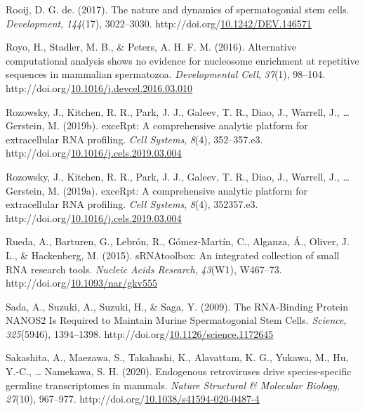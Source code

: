 \documentclass[12pt,twoside]{reedthesis}
\newlength{\cslhangindent}
\newenvironment{CSLReferences}[2] %
 {%
  \setlength{\parindent}{0pt}
  \ifodd #1 \everypar{\setlength{\hangindent}{\cslhangindent}}\ignorespaces\fi
  \ifnum #2 > 0
  \setlength{\parskip}{#2\baselineskip}
  \fi
 }%
 {}
\begin{document}
\begin{CSLReferences}{1}{0}
\leavevmode{}%
Rooij, D. G. de. (2017). The nature and dynamics of spermatogonial stem cells. \emph{Development}, \emph{144}(17), 3022--3030. http://doi.org/\href{https://doi.org/10.1242/DEV.146571}{10.1242/DEV.146571}

\leavevmode{}%
Royo, H., Stadler, M. B., \& Peters, A. H. F. M. (2016). Alternative computational analysis shows no evidence for nucleosome enrichment at repetitive sequences in mammalian spermatozoa. \emph{Developmental Cell}, \emph{37}(1), 98--104. http://doi.org/\href{https://doi.org/10.1016/j.devcel.2016.03.010}{10.1016/j.devcel.2016.03.010}

\leavevmode{}%
Rozowsky, J., Kitchen, R. R., Park, J. J., Galeev, T. R., Diao, J., Warrell, J., \ldots{} Gerstein, M. (2019b). {exceRpt}: A comprehensive analytic platform for extracellular {RNA} profiling. \emph{Cell Systems}, \emph{8}(4), 352--357.e3. http://doi.org/\href{https://doi.org/10.1016/j.cels.2019.03.004}{10.1016/j.cels.2019.03.004}

\leavevmode{}%
Rozowsky, J., Kitchen, R. R., Park, J. J., Galeev, T. R., Diao, J., Warrell, J., \ldots{} Gerstein, M. (2019a). exceRpt: A comprehensive analytic platform for extracellular RNA profiling. \emph{Cell Systems}, \emph{8}(4), 352357.e3. http://doi.org/\href{https://doi.org/10.1016/j.cels.2019.03.004}{10.1016/j.cels.2019.03.004}

\leavevmode{}%
Rueda, A., Barturen, G., Lebrón, R., Gómez-Martín, C., Alganza, Á., Oliver, J. L., \& Hackenberg, M. (2015). sRNAtoolbox: An integrated collection of small RNA research tools. \emph{Nucleic Acids Research}, \emph{43}(W1), W467--73. http://doi.org/\href{https://doi.org/10.1093/nar/gkv555}{10.1093/nar/gkv555}

\leavevmode{}%
Sada, A., Suzuki, A., Suzuki, H., \& Saga, Y. (2009). The RNA-Binding Protein NANOS2 Is Required to Maintain Murine Spermatogonial Stem Cells. \emph{Science}, \emph{325}(5946), 1394--1398. http://doi.org/\href{https://doi.org/10.1126/science.1172645}{10.1126/science.1172645}

\leavevmode{}%
Sakashita, A., Maezawa, S., Takahashi, K., Alavattam, K. G., Yukawa, M., Hu, Y.-C., \ldots{} Namekawa, S. H. (2020). Endogenous retroviruses drive species-specific germline transcriptomes in mammals. \emph{Nature Structural \& Molecular Biology}, \emph{27}(10), 967--977. http://doi.org/\href{https://doi.org/10.1038/s41594-020-0487-4}{10.1038/s41594-020-0487-4}


\end{CSLReferences}
\end{document}
